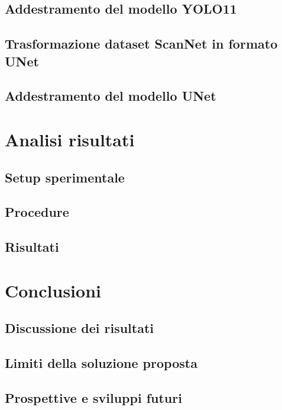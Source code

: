 \documentclass[12pt]{report}
\begin{document}
\section{Addestramento del modello YOLO11}
\label{chap:addestramento_yolo}

\section{Trasformazione dataset ScanNet in formato UNet}
\label{chap:dataset_scannet_unet}

\section{Addestramento del modello UNet}
\label{chap:addestramento_unet}

\chapter{Analisi risultati}
\label{chap:analisi}

\section{Setup sperimentale}
\label{chap:setup}

\section{Procedure}
\label{procedure}

\section{Risultati}
\label{risultati}

\chapter{Conclusioni}
\label{chap:conclusioni}

\section{Discussione dei risultati}
\label{chap:discussione_risultati}

\section{Limiti della soluzione proposta}
\label{chap:limiti}

\section{Prospettive e sviluppi futuri}
\label{chap:prospettive}

\beforebibliography



\closingpage
\end{document}
